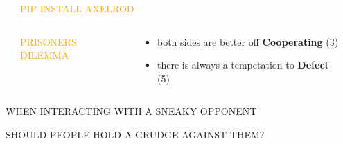 \documentclass[usenames,dvipsnames,t]{beamer}
\begin{document}
\begin{frame}[fragile]

\begin{columns}
  \begin{column}{.03\linewidth}
  \end{column}
  \begin{column}{.45\linewidth}
   \vspace{1cm}

    \centering
    {\fontsize{120}{130}\selectfont\textcolor{orange}{PIP \hspace{2.5cm} INSTALL \hspace{2cm} AXELROD}}

  \begin{columns}
  \begin{column}{.39\linewidth}

   \vspace{1cm}

    \centering
    \textcolor{orange}{\LARGE{PRISONERS DILEMMA}}
  \end{column}
  \begin{column}{.55\linewidth}
    \large{
    \begin{itemize}
      \item both sides are better off \textbf{Cooperating} (3)
      \item there is always a tempetation to \textbf{Defect} (5)
    \end{itemize}
    }
    \end{column}
    \end{columns}
  \end{column}
  \begin{column}{.30\linewidth}

 \hspace{9cm}  
  \end{column}
  \end{columns}
  \begin{columns}
    \begin{column}{.25\linewidth}
   \vspace{1cm}

\begin{center}
\Large{\textcolor{red!80}{WHEN INTERACTING WITH A SNEAKY OPPONENT}}
\end{center}
\begin{center}
\Large{\textcolor{red!80}{SHOULD PEOPLE HOLD A GRUDGE AGAINST THEM?}}
\end{center}


\end{column}
\end{columns}
\end{frame}
\end{document}
